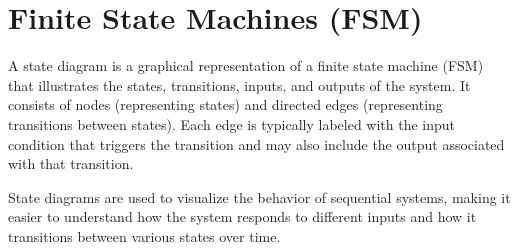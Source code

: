 \documentclass[11pt]{report}
\begin{document}
\section{Finite State Machines (FSM)}
\begin{definition}
    A state diagram is a graphical representation of a finite state machine (FSM) that illustrates the states, transitions, inputs, and outputs of the system. It consists of nodes (representing states) and directed edges (representing transitions between states). Each edge is typically labeled with the input condition that triggers the transition and may also include the output associated with that transition.

    State diagrams are used to visualize the behavior of sequential systems, making it easier to understand how the system responds to different inputs and how it transitions between various states over time.
\end{definition}
\end{document}
